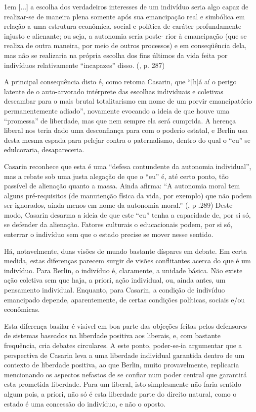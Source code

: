 \documentclass[12pt,a4paper]{article}
\newenvironment{citac}
{
	\begin{addmargin}
		[4cm]{1em} \footnotesize}{\normalfont 
	\end{addmargin}
}
\begin{document}
	\begin{citac}
		[...] a escolha dos verdadeiros interesses
		de um indivíduo seria algo capaz de realizar-se de
		maneira plena somente após sua emancipação real
		e simbólica em relação a uma estrutura econômica, 
		social e política de caráter profundamente injusto 
		e alienante; ou seja, a autonomia seria poste-
		rior à emancipação (que se realiza de outra maneira, 
		por meio de outros processos) e em conseqüência dela, 
		mas não se realizaria na própria escolha dos fins 
		últimos da vida feita por indivíduos relativamente 
		“incapazes” disso. (\cite{casarin}, p. 287)
	\end{citac}

	A principal consequência disto é, como retoma Casarin, que 
	“[h]á aí o perigo latente de o auto-arvorado intérprete das
	escolhas individuais e coletivas descambar para o mais brutal 
	totalitarismo em nome de um porvir emancipatório 
	permanentemente adiado”, novamente evocando a ideia de que houve uma 
	“promessa” de liberdade, mas que nem sempre ela será cumprida. 
	A herença liberal nos teria dado uma desconfiança para com o poderio 
	estatal, e Berlin usa desta mesma espada para pelejar contra o 
	paternalismo, dentro do qual o “eu” se edulcoraria, desapareceria. 

	Casarin reconhece que esta é uma “defesa contundente da autonomia 
	individual”, mas a rebate sob uma justa alegação de que o “eu” é, 
	até certo ponto, tão passível de alienação quanto a massa. Ainda 
	afirma: “A autonomia moral tem alguns pré-requisitos (de
	manutenção física da vida, por exemplo) que não podem ser ignorados, 
	ainda menos em nome da autonomia moral.” (\cite{casarin}, p .289)
	Deste modo, Casarin desarma a ideia de que este “eu” tenha a 
	capacidade de, por si só, se defender da alienação. Fatores 
	culturais o educacionais podem, por si só, enterrar o indivíduo 
	sem que o estado precise se mover nesse sentido. 

	Há, notavelmente, duas visões de mundo bastante díspares em debate. 
	Em certa medida, estas diferenças parecem surgir de visões 
	conflitantes acerca do que é um indivíduo. Para Berlin, o indivíduo 
	é, claramente, a unidade básica. Não existe ação coletiva sem que 
	haja, a priori, ação individual, ou, ainda antes, um pensamento 
	individual. Enquanto, para Casarin, a condição de indivíduo 
	emancipado depende, aparentemente, de certas condições políticas, 
	sociais e/ou econômicas. 

	Esta diferença basilar é visível em boa parte das objeções feitas 
	pelos defensores de sistemas baseados na liberdade positiva aos 
	liberais, e, com bastante frequência, cria debates circulares. A 
	este ponto, poder-se-ia argumentar que a perspectiva de Casarin 
	leva a uma liberdade individual garantida dentro de um contexto de 
	liberdade positiva, ao que Berlin, muito provavelmente, replicaria 
	mencionando os aspectos nefastos de se confiar num poder central 
	que garantirá esta prometida liberdade. Para um liberal, isto 
	simplesmente não faria sentido algum pois, a priori, não só é 
	esta liberdade parte do direito natural, como o estado é uma 
	concessão do indivíduo, e não o oposto. 
\end{document}
